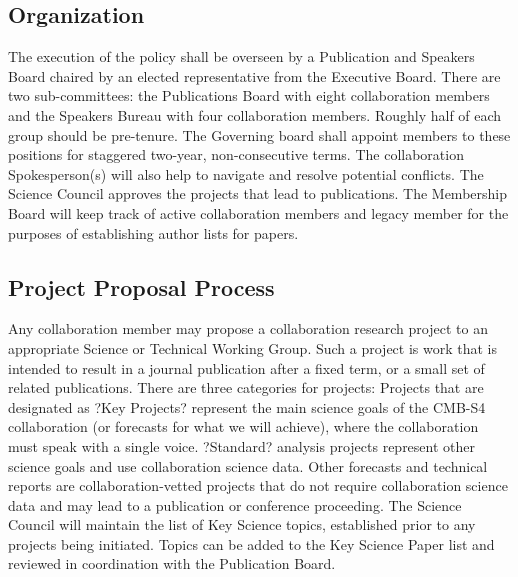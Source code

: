 \subsection{Organization}
The execution of the policy shall be overseen by a Publication and Speakers Board chaired by an elected representative from the Executive Board.  There are two sub-committees: the Publications Board with eight collaboration members and the Speakers Bureau with four collaboration members. Roughly half of each group should be pre-tenure. The Governing board shall appoint members to these positions for staggered two-year, non-consecutive terms. The collaboration Spokesperson(s) will also help to navigate and resolve potential conflicts. The Science Council approves the projects that lead to publications. The Membership Board will keep track of active collaboration members and legacy member for the purposes of establishing author lists for papers.

\subsection{Project Proposal Process}


Any collaboration member may propose a collaboration research project to an appropriate Science or Technical Working Group.  Such a project is work that is intended to result in a journal publication after a fixed term, or a small set of related publications.  There are three categories for projects:
Projects that are designated as ?Key Projects? represent the main science goals of the CMB-S4 collaboration (or forecasts for what we will achieve), where the collaboration must speak with a single voice.  
?Standard? analysis projects represent other science goals and use collaboration science data.  
Other forecasts and technical reports are collaboration-vetted projects that do not require collaboration science data and may lead to a publication or conference proceeding.  
The Science Council will maintain the list of Key Science topics, established prior to any projects being initiated.  Topics can be added to the Key Science Paper list and reviewed in coordination with the Publication Board.


